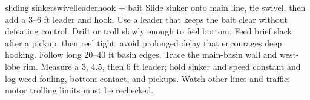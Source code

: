 
{{sliding sinker}{swivel}{leader}{hook + bait}}
{Slide sinker onto main line, tie swivel, then add a 3--6 ft leader and hook.
Use a leader that keeps the bait clear without defeating control.}
{Drift or troll slowly enough to feel bottom. Feed brief slack after a pickup,
then reel tight; avoid prolonged delay that encourages deep hooking.}
{Follow long 20--40 ft basin edges.}
{Trace the main-basin wall and west-lobe rim.}
{Measure a 3, 4.5, then 6 ft leader; hold sinker and speed constant and log
weed fouling, bottom contact, and pickups.}
{Watch other lines and traffic; motor trolling limits must be rechecked.}
